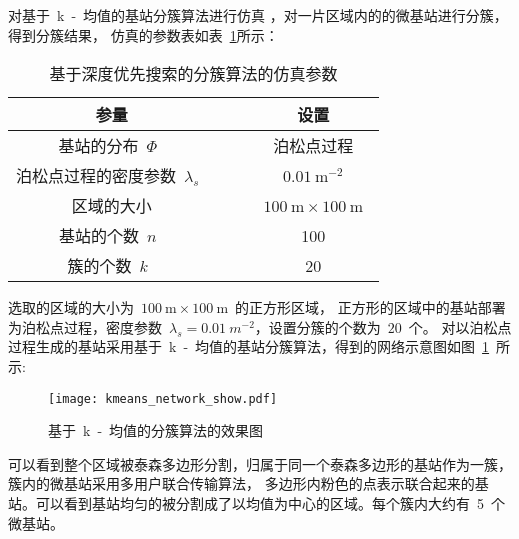 对基于~k~-~均值的基站分簇算法进行仿真
，对一片区域内的的微基站进行分簇，得到分簇结果，
仿真的参数表如表~\ref{kmeans_show_sim_para}所示：
\begin{table}[htbp]
\caption{基于深度优先搜索的分簇算法的仿真参数}
\label{kmeans_show_sim_para}
\vspace{0.5em}\centering\wuhao
\begin{tabular}{cccc}
\toprule[1.5pt]
参量 & & & 设置 \\
\midrule[0.5pt]
基站的分布~$\Phi$~ & & & 泊松点过程 \\
泊松点过程的密度参数~$\lambda_s$~ & & & ~$0.01~\mathrm{m}^{-2}$~ \\
区域的大小  & & & ~$100~\mathrm{m} \times 100~ \mathrm{m}$~ \\
基站的个数~$n$~  & & & 100\\
簇的个数~$k$~ & & & ~$20$~\\
\bottomrule[1.5pt]
\end{tabular}
\end{table}

选取的区域的大小为~$100~\mathrm{m} \times 100~ \mathrm{m}$~的正方形区域，
正方形的区域中的基站部署为泊松点过程，密度参数~$\lambda_s=0.01~m^{-2}$，设置分簇的个数为~$20$~个。
对以泊松点过程生成的基站采用基于~k~-~均值的基站分簇算法，得到的网络示意图如图~\ref{kmeans_network_show}~所示:
\begin{figure}[htbp]
\centering
\texttt{[image: kmeans\_network\_show.pdf]}
\caption{基于~k~-~均值的分簇算法的效果图}\vspace{-0.5em}
\label{kmeans_network_show}
\end{figure}
可以看到整个区域被泰森多边形分割，归属于同一个泰森多边形的基站作为一簇，簇内的微基站采用多用户联合传输算法，
多边形内粉色的点表示联合起来的基站。可以看到基站均匀的被分割成了以均值为中心的区域。每个簇内大约有~5~个微基站。
